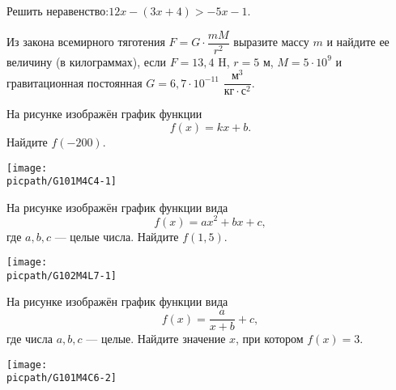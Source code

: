 \begin{exam}
	\begin{listofex}
		\item Решить неравенство:\quad\( 12x-(3x+4) > -5x-1 \).
		\item Из закона всемирного тяготения \( F=G\cdot\dfrac{mM}{r^2} \) выразите массу \( m \) и найдите ее величину (в килограммах), если \( F=13,4 \) H, \( r=5 \) м, \( M=5\cdot10^9 \) и гравитационная постоянная \( G=6,7\cdot10^{-11} \) \( \dfrac{\text{м}^3}{\text{кг}\cdot\text{с}^2} \).
		\item
		\begin{minipage}[t]{\bodywidth}
			На рисунке изображён график функции \[ f(x)=kx+b. \] Найдите \(f(-200)\).
		\end{minipage}
		\hspace{0.02\linewidth}
		\begin{minipage}[t]{\picwidth}
			\texttt{[image: \\picpath/G101M4C4-1]}
		\end{minipage}
		\item
		\begin{minipage}[t]{\bodywidth}
			На рисунке изображён график функции вида \[ f(x)=ax^2+bx+c, \] где  \(a, b, c\) --- целые числа. Найдите \(f(1,5)\).
		\end{minipage}
		\hspace{0.02\linewidth}
		\begin{minipage}[t]{\picwidth}
			\texttt{[image: \\picpath/G102M4L7-1]}
		\end{minipage}
		\item
		\begin{minipage}[t]{\bodywidth}
			На рисунке изображён график функции вида \[ f(x)=\dfrac{a}{x+b}+c, \] где числа \(a, b, c\) --- целые. Найдите значение \(x\), при котором \(f(x)=3\).
		\end{minipage}
		\hspace{0.02\linewidth}
		\begin{minipage}[t]{\picwidth}
			\texttt{[image: \\picpath/G101M4C6-2]}
		\end{minipage}

\end{listofex}
\end{exam}
